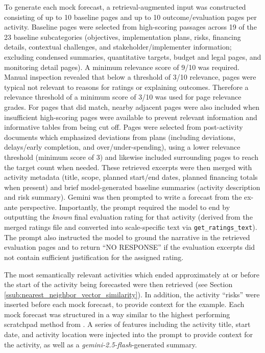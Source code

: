 To generate each mock forecast, a retrieval-augmented input was constructed consisting of up to 10 baseline pages and up to 10 outcome/evaluation pages per activity. Baseline pages were selected from high-scoring passages across 19 of the 23 baseline subcategories (objectives, implementation plans, risks, financing details, contextual challenges, and stakeholder/implementer information; excluding condensed summaries, quantitative targets, budget and legal pages, and monitoring detail pages). A minimum relevance score of 9/10 was required. Manual inspection revealed that below a threshold of 3/10 relevance, pages were typical not relevant to reasons for ratings or explaining outcomes. Therefore a relevance threshold of a minimum score of 3/10 was used for page relevance grades. For pages that did match, nearby adjacent pages were also included when insufficient high-scoring pages were available to prevent relevant information and informative tables from being cut off. Pages were selected from post-activity documents which emphasized deviations from plans (including deviations, delays/early completion, and over/under-spending), using a lower relevance threshold (minimum score of 3) and likewise included surrounding pages to reach the target count when needed. These retrieved excerpts were then merged with activity metadata (title, scope, planned start/end dates, planned financing totals when present) and brief model-generated baseline summaries (activity description and risk summary). Gemini was then prompted to write a forecast from the ex-ante perspective. Importantly, the prompt required the model to end by outputting the \emph{known} final evaluation rating for that activity (derived from the merged ratings file and converted into scale-specific text via \texttt{get\_ratings\_text}). The prompt also instructed the model to ground the narrative in the retrieved evaluation pages and to return ``NO RESPONSE'' if the evaluation excerpts did not contain sufficient justification for the assigned rating.


The most semantically relevant activities which ended approximately at or before the start of the activity being forecasted were then retrieved (see Section \ref{ssub:nearest_neighbor_vector_similarity}). In addition, the activity ``risks'' were inserted before each mock forecast, to provide context for the example. Each mock forecast was structured in a way similar to the highest performing scratchpad method from \citep{halawiApproachingHumanLevelForecasting2024}.
A series of features including the activity title, start date, and activity location were injected into the prompt to provide context for the activity, as well as a \emph{gemini-2.5-flash}-generated summary.

